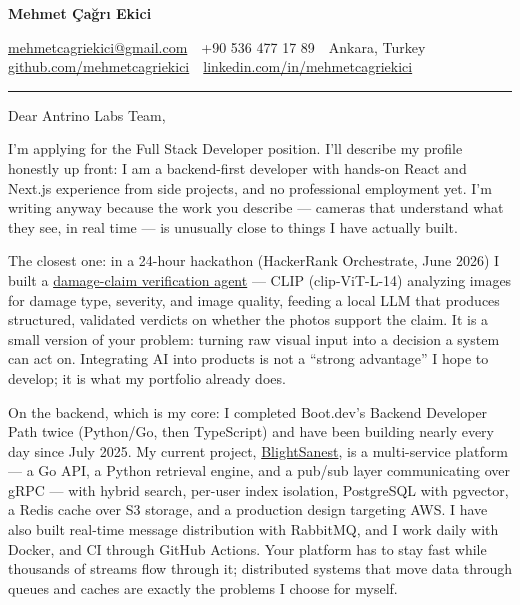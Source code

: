 \documentclass[11pt,a4paper]{article}
\begin{document}
{\LARGE\bfseries\color{accent} Mehmet Çağrı Ekici}\par
\vspace{2pt}
{\small
\href{mailto:mehmetcagriekici@gmail.com}{mehmetcagriekici@gmail.com} \,\textbullet\,
+90 536 477 17 89 \,\textbullet\,
Ankara, Turkey \,\textbullet\,
\href{https://github.com/mehmetcagriekici}{github.com/mehmetcagriekici} \,\textbullet\,
\href{https://linkedin.com/in/mehmetcagriekici}{linkedin.com/in/mehmetcagriekici}
}

\vspace{10pt}
\hrule
\vspace{14pt}

Dear Antrino Labs Team,

I'm applying for the Full Stack Developer position. I'll describe my profile honestly up front: I am a backend-first developer with hands-on React and Next.js experience from side projects, and no professional employment yet. I'm writing anyway because the work you describe --- cameras that understand what they see, in real time --- is unusually close to things I have actually built.

The closest one: in a 24-hour hackathon (HackerRank Orchestrate, June 2026) I built a \href{https://github.com/mehmetcagriekici/hackerrank-orchestrate-june26}{damage-claim verification agent} --- CLIP (clip-ViT-L-14) analyzing images for damage type, severity, and image quality, feeding a local LLM that produces structured, validated verdicts on whether the photos support the claim. It is a small version of your problem: turning raw visual input into a decision a system can act on. Integrating AI into products is not a ``strong advantage'' I hope to develop; it is what my portfolio already does.

On the backend, which is my core: I completed Boot.dev's Backend Developer Path twice (Python/Go, then TypeScript) and have been building nearly every day since July 2025. My current project, \href{https://github.com/mehmetcagriekici/blightsanest_stable_insights}{BlightSanest}, is a multi-service platform --- a Go API, a Python retrieval engine, and a pub/sub layer communicating over gRPC --- with hybrid search, per-user index isolation, PostgreSQL with pgvector, a Redis cache over S3 storage, and a production design targeting AWS. I have also built real-time message distribution with RabbitMQ, and I work daily with Docker, and CI through GitHub Actions. Your platform has to stay fast while thousands of streams flow through it; distributed systems that move data through queues and caches are exactly the problems I choose for myself.
\end{document}
